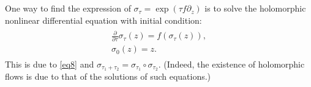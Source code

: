 \documentclass[11pt,b5paper,notitlepage]{article}
\theoremstyle{definition}
\newtheorem{rem}[df]{Remark}
\theoremstyle{plain}
\newcommand{\ovl}{\overline}
\newcommand{\im}{\mathbf{i}}
\newcommand{\Real}{\mathrm{Re}}
\newcommand{\Imag}{\mathrm{Im}}
\numberwithin{equation}{section}
\begin{document}

\subsection{}

One way to find the expression of $\sigma_\tau=\exp(\tau f\partial_z)$ is to solve the holomorphic nonlinear differential equation with initial condition:
\begin{gather}
\begin{gathered}\label{eq10}
\frac \partial{\partial\tau}\sigma_\tau(z)=f(\sigma_\tau(z)),\\
\sigma_0(z)=z.
\end{gathered}
\end{gather} 
This is due to \eqref{eq8} and $\sigma_{\tau_1+\tau_2}=\sigma_{\tau_1}\circ\sigma_{\tau_2}$. (Indeed, the existence of holomorphic flows is due to that of the solutions of such equations.)
\end{document}
